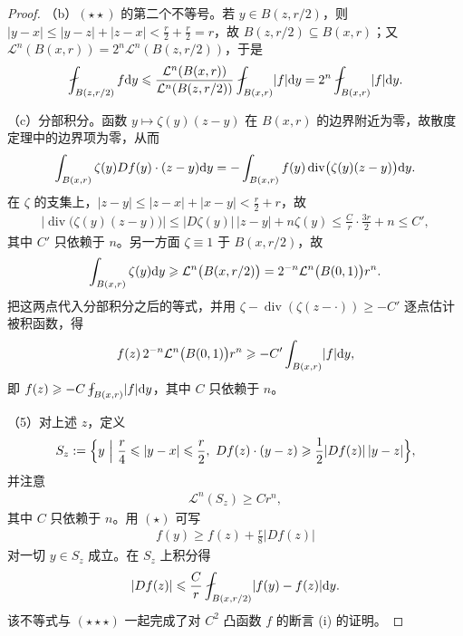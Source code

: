 \documentclass[../../main.tex]{subfiles}%
\begin{document}
\begin{proof}
（b）$(\star\star)$ 的第二个不等号。若 $y\in B(z,r/2)$，则 $\lvert y-x\rvert\leqslant\lvert y-z\rvert+\lvert z-x\rvert<\frac r2+\frac r2=r$，故 $B(z,r/2)\subseteq B(x,r)$；又 $\mathcal{L}^{n}(B(x,r))=2^{n}\mathcal{L}^{n}(B(z,r/2))$，于是
\begin{align*}
\fint_{B(z,r/2)}f\diff y\leqslant\frac{\mathcal{L}^{n}(B(x,r))}{\mathcal{L}^{n}(B(z,r/2))}\fint_{B(x,r)}\lvert f\rvert\diff y=2^{n}\fint_{B(x,r)}\lvert f\rvert\diff y .
\end{align*}

（c）分部积分。函数 $y\mapsto\zeta(y)(z-y)$ 在 $B(x,r)$ 的边界附近为零，故散度定理中的边界项为零，从而
\begin{align*}
\int_{B(x,r)}\zeta(y)Df(y)\cdot(z-y)\mathrm{d} y=-\int_{B(x,r)}f(y)\operatorname{div}\bigl(\zeta(y)(z-y)\bigr)\mathrm{d} y .
\end{align*}
在 $\zeta$ 的支集上，$\lvert z-y\rvert\leqslant\lvert z-x\rvert+\lvert x-y\rvert<\frac r2+r$，故
\begin{align*}
\bigl\lvert\operatorname{div}\bigl(\zeta(y)(z-y)\bigr)\bigr\rvert\leqslant\lvert D\zeta(y)\rvert\,\lvert z-y\rvert+n\zeta(y)\leqslant\frac Cr\cdot\frac{3r}{2}+n\leqslant C',
\end{align*}
其中 $C'$ 只依赖于 $n$。另一方面 $\zeta\equiv1$ 于 $B(x,r/2)$，故
\begin{align*}
\int_{B(x,r)}\zeta(y)\mathrm{d} y\geqslant\mathcal{L}^{n}\bigl(B(x,r/2)\bigr)=2^{-n}\mathcal{L}^{n}\bigl(B(0,1)\bigr)r^{n}.
\end{align*}
把这两点代入分部积分之后的等式，并用 $\zeta-\operatorname{div}(\zeta(z-\cdot))\geqslant-C'$ 逐点估计被积函数，得
\begin{align*}
f(z)\,2^{-n}\mathcal{L}^{n}\bigl(B(0,1)\bigr)r^{n}\geqslant-C'\int_{B(x,r)}\lvert f\rvert\mathrm{d} y,
\end{align*}
即 $f(z)\geqslant-C\fint_{B(x,r)}\lvert f\rvert\diff y$，其中 $C$ 只依赖于 $n$。

（5）对上述 $z$，定义
\begin{align*}
S_z:=\Bigl\{y\ \Big|\ \frac r4\leqslant\lvert y-x\rvert\leqslant\frac r2,\ Df(z)\cdot(y-z)\geqslant\frac12\lvert Df(z)\rvert\,\lvert y-z\rvert\Bigr\},
\end{align*}
并注意
\begin{align*}
\mathcal{L}^{n}(S_z)\geqslant Cr^{n},
\end{align*}
其中 $C$ 只依赖于 $n$。用 $(\star)$ 可写
\begin{align*}
f(y)\geqslant f(z)+\frac r8\lvert Df(z)\rvert
\end{align*}
对一切 $y\in S_z$ 成立。在 $S_z$ 上积分得
\begin{align*}
\lvert Df(z)\rvert\leqslant\frac Cr\fint_{B(x,r/2)}\lvert f(y)-f(z)\rvert\diff y .
\end{align*}
该不等式与 $(\star\star\star)$ 一起完成了对 $C^{2}$ 凸函数 $f$ 的断言 (i) 的证明。


\end{proof}
\end{document}

